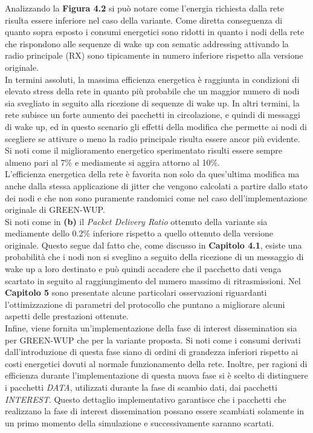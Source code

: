 \documentclass[binding=0.6cm,TFA]{sapthesis}
\begin{document}
Analizzando la \textbf{Figura 4.2} si può notare come l'energia richiesta dalla rete risulta essere inferiore nel caso della variante.
Come diretta conseguenza di quanto sopra esposto i consumi energetici sono ridotti in quanto i nodi della rete che rispondono alle sequenze
di wake up con sematic addressing attivando la radio principale (RX) sono tipicamente in numero inferiore rispetto alla versione originale.\\

In termini assoluti, la massima efficienza energetica è raggiunta in condizioni di elevato stress della rete in quanto più probabile
che un maggior numero di nodi sia svegliato in seguito alla ricezione di sequenze di wake up. In altri termini, la rete subisce un forte aumento
dei pacchetti in circolazione, e quindi di messaggi di wake up, ed in questo scenario gli effetti della modifica che permette ai nodi di
scegliere se attivare o meno la radio principale risulta essere ancor più evidente. Si noti come il miglioramento energetico sperimentato
risulti essere sempre almeno pari al 7\% e mediamente si aggira attorno al 10\%.\\

L'efficienza energetica della rete è favorita non solo da ques'ultima modifica ma anche dalla stessa applicazione di jitter che vengono
calcolati a partire dallo stato dei nodi e che non sono puramente randomici come nel caso dell'implementazione originale di GREEN-WUP.\\

Si noti come in \textbf{(b)} il \emph{Packet Delivery Ratio} ottenuto della variante sia mediamente dello 0.2\% inferiore rispetto a quello ottenuto
della versione originale. Questo segue dal fatto che, come discusso in \textbf{Capitolo 4.1}, esiste una probabilità che i nodi non si
sveglino a seguito della ricezione di un messaggio di wake up a loro destinato e può quindi accadere che il pacchetto dati venga scartato in seguito
al raggiungimento del numero massimo di ritrasmissioni. Nel \textbf{Capitolo 5} sono presentate alcune particolari osservazioni riguardanti
l'ottimizzazione di parametri del protocollo che puntano a migliorare alcuni aspetti delle prestazioni ottenute.\\

Infine, viene fornita un'implementazione della fase di interest dissemination sia per GREEN-WUP che per la variante proposta. Si noti come i consumi
derivati dall'introduzione di questa fase siano di ordini di grandezza inferiori rispetto ai costi energetici dovuti al normale funzionamento della rete.
Inoltre, per ragioni di efficienza durante l'implementazione di questa nuova fase si è scelto di distinguere i pacchetti \emph{DATA}, utilizzati
durante la fase di scambio dati, dai pacchetti \emph{INTEREST}. Questo dettaglio implementativo garantisce che i pacchetti che realizzano la
fase di interest dissemination possano essere scambiati solamente in un primo momento della simulazione e successivamente saranno scartati.\\
\end{document}
